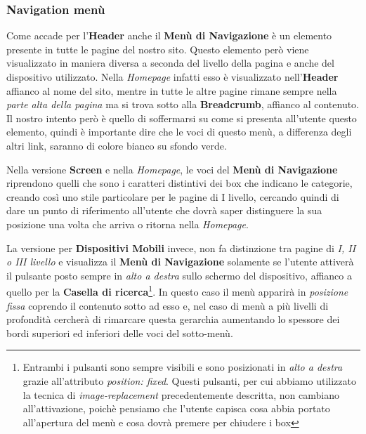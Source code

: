 \subsubsection{Navigation menù}\label{sec:Pres-Nav}
Come accade per l'\textbf{Header} anche il \textbf{Menù di Navigazione} è un elemento presente in tutte le pagine del nostro sito. Questo elemento però viene visualizzato in maniera diversa a seconda del livello della pagina e anche del dispositivo utilizzato. Nella \textit{Homepage} infatti esso è visualizzato nell'\textbf{Header} affianco al nome del sito, mentre in tutte le altre pagine rimane sempre nella \textit{parte alta della pagina} ma si trova sotto alla \textbf{Breadcrumb}, affianco al contenuto. Il nostro intento però è quello di soffermarsi su come si presenta all'utente questo elemento, quindi è importante dire che le voci di questo menù, a differenza degli altri link, saranno di colore bianco su sfondo verde.

Nella versione \textbf{Screen} e nella \textit{Homepage}, le voci del \textbf{Menù di Navigazione} riprendono quelli che sono i caratteri distintivi dei box che indicano le categorie, creando così uno stile particolare per le pagine di I livello, cercando quindi di dare un punto di riferimento all'utente che dovrà saper distinguere la sua posizione una volta che arriva o ritorna nella \textit{Homepage}.

La versione per \textbf{Dispositivi Mobili} invece, non fa distinzione tra pagine di \textit{I, II o III livello} e visualizza il \textbf{Menù di Navigazione} solamente se l'utente attiverà il pulsante posto sempre in \textit{alto a destra} sullo schermo del dispositivo, affianco a quello per la \textbf{Casella di ricerca}\footnote{Entrambi i pulsanti sono sempre visibili e sono posizionati in \textit{alto a destra} grazie all'attributo \textit{position: fixed}. Questi pulsanti, per cui abbiamo utilizzato la tecnica di \textit{image-replacement} precedentemente descritta, non cambiano all'attivazione, poichè pensiamo che l'utente capisca cosa abbia portato all'apertura del menù e cosa dovrà premere per chiudere i box}. In questo caso il menù apparirà in \textit{posizione fissa} coprendo il contenuto sotto ad esso e, nel caso di menù a più livelli di profondità cercherà di rimarcare questa gerarchia aumentando lo spessore dei bordi superiori ed inferiori delle voci del sotto-menù.

